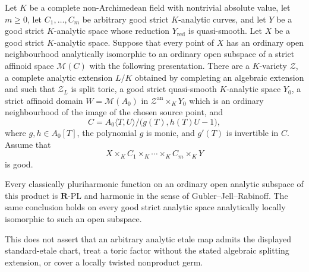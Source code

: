 
\begin{corollary}
\label{cor:p061-analytic-standard-etale-arbitrary-curve-factor-products}
Let $K$ be a complete non-Archimedean field with nontrivial absolute value,
let $m\geq0$, let $C_1,\ldots,C_m$ be arbitrary good strict $K$-analytic
curves, and let $Y$ be a good strict $K$-analytic space whose reduction
$Y_{\mathrm{red}}$ is quasi-smooth.  Let $X$ be a good strict $K$-analytic
space.  Suppose that every point of $X$ has an ordinary open neighbourhood
analytically isomorphic to an ordinary open subspace of a strict affinoid
space $\mathcal M(C)$ with the following presentation.  There are a
$K$-variety $\mathcal Z$, a complete analytic extension $L/K$ obtained by
completing an algebraic extension and such that $\mathcal Z_L$ is split
toric, a good strict quasi-smooth $K$-analytic space $Y_0$, a strict affinoid
domain $W=\mathcal M(A_0)$ in
$\mathcal Z^{\mathrm{an}}\times_KY_0$ which is an ordinary neighbourhood of
the image of the chosen source point, and
\[
 C=A_0\langle T,U\rangle/\bigl(g(T),h(T)U-1\bigr),
\]
where $g,h\in A_0[T]$, the polynomial $g$ is monic, and $g'(T)$ is
invertible in $C$.  Assume that
\[
 X\times_KC_1\times_K\cdots\times_KC_m\times_KY
\]
is good.

Every classically pluriharmonic function on an ordinary open analytic
subspace of this product is $\mathbf R$-PL and harmonic in the sense of
Gubler--Jell--Rabinoff.  The same conclusion holds on every good strict
analytic space analytically locally isomorphic to such an open subspace.

This does not assert that an arbitrary analytic etale map admits the
displayed standard-etale chart, treat a toric factor without the stated
algebraic splitting extension, or cover a locally twisted nonproduct germ.
\end{corollary}
